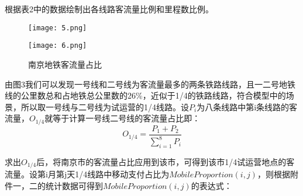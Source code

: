 \documentclass[withoutpreface,bwprint]{cumcmthesis} %
\begin{document}
根据表2中的数据绘制出各线路客流量比例和里程数比例。
\begin{figure}[h]
\centering
\begin{minipage}[c]{0.4\textwidth}
\centering
\texttt{[image: 5.png]}
\end{minipage}
\begin{minipage}[c]{0.4\textwidth}
\centering
\texttt{[image: 6.png]}
\end{minipage}
\caption{南京地铁客流量占比}
\end{figure}

由图3我们可以发现一号线和二号线为客流量最多的两条铁路线路，且一二号地铁线的公里数总和占地铁总公里数的26\%，近似于1/4的铁路线路，符合模型中的场景，所以取一号线与二号线为试运营的1/4线路。设$P_i$为八条线路中第i条线路的客流量，$O_{1/4}$就等于计算一号线二号线的客流量占比即：
\begin{equation}
O_{1/4}=\frac{P_1+P_2}{\sum_{i=1}^{8}P_i}
\end{equation}

求出$O_{1/4}$后，将南京市的客流量占比应用到该市，可得到该市1/4试运营地点的客流量。设第i月第j天1/4线路中移动支付占比为$MobileProportion(i,j)$，则根据附件一，二的统计数据可得到$MobileProportion(i,j)$的表达式：
\end{document}
